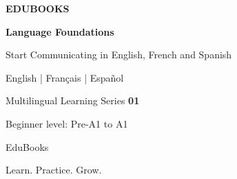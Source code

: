 \begin{titlepage}
\thispagestyle{empty}
\centering
\vspace*{2.1cm}
{\Large\bfseries\color{EduBooksTeal} EDUBOOKS\par}
\vspace{1.8cm}
{\Huge\bfseries\color{EduBooksNavy} Language Foundations\par}
\vspace{0.55cm}
{\Large Start Communicating in English, French and Spanish\par}
\vspace{1.4cm}
{\large English \quad | \quad Français \quad | \quad Español\par}
\vfill
{\large Multilingual Learning Series \textbf{01}\par}
\vspace{0.3cm}
{\normalsize Beginner level: Pre-A1 to A1\par}
\vspace{1.5cm}
{\large EduBooks\par}
{\small Learn. Practice. Grow.\par}
\vspace*{1.2cm}
\end{titlepage}
\clearpage
